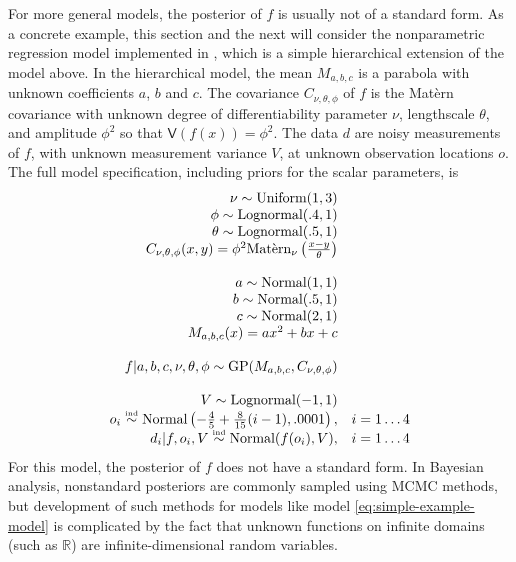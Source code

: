 \documentclass[article]{jss}
\begin{document}
For more general models, the posterior of $f$ is usually not of a standard form. As a concrete example, this section and the next will consider the nonparametric regression model implemented in , which is a simple hierarchical extension of the model above. In the hierarchical model, the mean $M_{a,b,c}$ is a parabola with unknown coefficients $a$, $b$ and $c$. The covariance $C_{\nu,\theta,\phi}$ of $f$ is the Mat\`ern covariance with unknown degree of differentiability parameter $\nu$, lengthscale $\theta$, and amplitude $\phi^2$ so that $\mathsf{V}(f(x))=\phi^2$. The data $d$ are noisy measurements of $f$, with unknown measurement variance $V$, at unknown observation locations $o$. The full model specification, including priors for the scalar parameters, is
\begin{equation}
    \label{eq:simple-example-model} 
    \begin{array}{rr}
    \nu\sim\textup{Uniform}(1,3)&\\
    \phi\sim\textup{Lognormal}(.4,1)&\\
    \theta\sim\textup{Lognormal}(.5,1)&\\
    C_{\nu,\theta,\phi}(x,y) = \phi^2\textup{Mat\`ern}_\nu\left( \frac{x-y}{\theta} \right)&\\
    &\\
    a\sim\textup{Normal}(1,1)&\\
    b\sim\textup{Normal}(.5,1)&\\
    c\sim\textup{Normal}(2,1)&\\
    M_{a,b,c}(x) = ax^2+bx+c&\\
    &\\
    f|a,b,c,\nu,\theta,\phi\sim\textup{GP}(M_{a,b,c}, C_{\nu,\theta,\phi})&\\
    &\\
    V\sim\textup{Lognormal}(-1,1)&\\
    o_i \stackrel{\textup{\tiny ind}}{\sim} \textup{Normal}\left(-\frac{4}{5}+\frac{8}{15}(i-1), .0001\right),&i=1\ldots 4\\
    d_i|f,o_i,V \stackrel{\textup{\tiny ind}}{\sim} \textup{Normal}(f(o_i),V),& i=1\ldots 4
        \end{array}
\end{equation}
For this model, the posterior of $f$ does not have a standard form. In Bayesian analysis, nonstandard posteriors are commonly sampled using MCMC methods, but development of such methods for models like model \ref{eq:simple-example-model} is complicated by the fact that unknown functions on infinite domains (such as $\mathbb R$) are infinite-dimensional random variables. 
\end{document}
